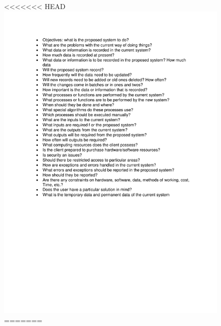 \begin{figure}[H]
<<<<<<< HEAD
    \includegraphics[width=\textwidth]{./Questions.pdf}
=======

\end{figure}
